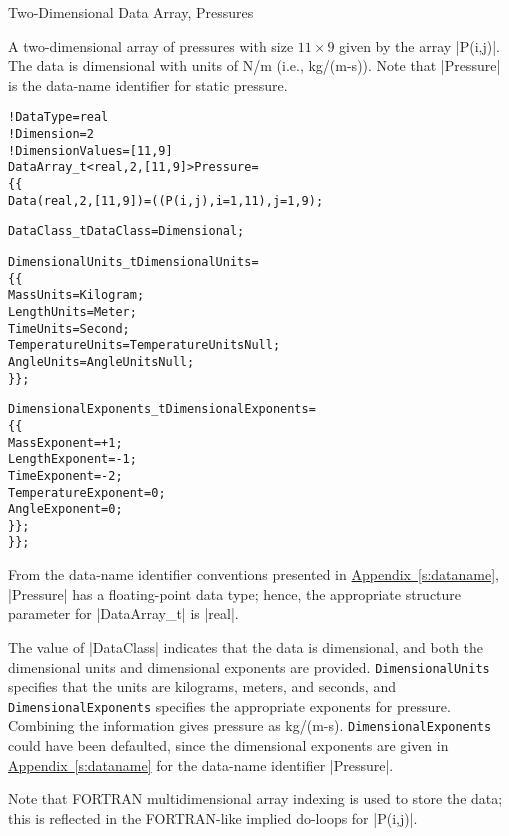 \begin{example}{Two-Dimensional Data Array, Pressures}
\label{ex:data2}

A two-dimensional array of pressures with size $11\times 9$ given by the
array |P(i,j)|.
The data is dimensional with units of N/m (i.e., kg/(m-s)).
Note that |Pressure| is the data-name identifier for static pressure.
\begin{alltt}
  !  DataType = real
  !  Dimension = 2
  !  DimensionValues = [11,9]
  DataArray\_t<real, 2, [11,9]> Pressure =
    \{\{
    Data(real, 2, [11,9]) = ((P(i,j), i=1,11), j=1,9) ;
    
    DataClass\_t DataClass = Dimensional ;

    DimensionalUnits\_t DimensionalUnits =
      \{\{
      MassUnits        = Kilogram ;
      LengthUnits      = Meter ;
      TimeUnits        = Second ;
      TemperatureUnits = TemperatureUnitsNull ;
      AngleUnits       = AngleUnitsNull ;
      \}\} ;
	
    DimensionalExponents\_t DimensionalExponents =
      \{\{
      MassExponent        = +1 ;
      LengthExponent      = -1 ;
      TimeExponent        = -2 ;
      TemperatureExponent =  0 ;
      AngleExponent       =  0 ;
      \}\} ;
    \}\} ;
\end{alltt}
From the data-name identifier conventions presented in
\hyperref[s:dataname]{Appendix~\ref*{s:dataname}}, |Pressure| has a
floating-point data type; hence, the appropriate structure parameter
for |DataArray_t| is |real|.  

The value of |DataClass| indicates that the data is dimensional, and
both the dimensional units and dimensional exponents are provided.
\texttt{DimensionalUnits} specifies that the units are kilograms,
meters, and seconds, and \texttt{DimensionalExponents} specifies the
appropriate exponents for pressure.
Combining the information gives pressure as kg/(m-s).
\texttt{DimensionalExponents} could have been defaulted, since the
dimensional exponents are given in
\hyperref[s:dataname]{Appendix~\ref*{s:dataname}} for the data-name
identifier |Pressure|.

Note that FORTRAN multidimensional array indexing is used to store the data;
this is reflected in the FORTRAN-like implied do-loops for |P(i,j)|.
\end{example}

